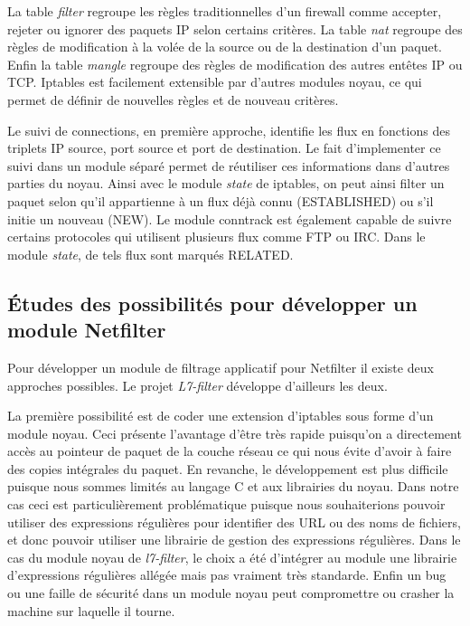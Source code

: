 La table \textit{filter} regroupe les règles traditionnelles d'un
firewall comme accepter, rejeter ou ignorer des paquets IP selon
certains critères. La table \textit{nat} regroupe des règles de
modification à la volée de la source ou de la destination d'un
paquet. Enfin la table \textit{mangle} regroupe des règles de
modification des autres entêtes IP ou TCP. Iptables est facilement
extensible par d'autres modules noyau, ce qui permet de définir de
nouvelles règles et de nouveau critères.

Le suivi de connections, en première approche, identifie les flux en
fonctions des triplets IP source, port source et port de
destination. Le fait d'implementer ce suivi dans un module séparé
permet de réutiliser ces informations dans d'autres parties du
noyau. Ainsi avec le module \textit{state} de iptables, on peut ainsi
filter un paquet selon qu'il appartienne à un flux déjà connu
(ESTABLISHED) ou s'il initie un nouveau (NEW). Le module conntrack est
également capable de suivre certains protocoles qui utilisent
plusieurs flux comme FTP ou IRC. Dans le module \textit{state}, de
tels flux sont marqués RELATED.

\subsection{Études des possibilités pour développer un module Netfilter}


Pour développer un module de filtrage applicatif pour Netfilter il
existe deux approches possibles. Le projet \textit{L7-filter}
\cite{l7} développe d'ailleurs les deux.

La première possibilité est de coder une extension d'iptables sous
forme d'un module noyau. Ceci présente l'avantage d'être très rapide
puisqu'on a directement accès au pointeur de paquet de la couche
réseau ce qui nous évite d'avoir à faire des copies intégrales du
paquet. En revanche, le développement est plus difficile puisque nous
sommes limités au langage C et aux librairies du noyau. Dans notre cas
ceci est particulièrement problématique puisque nous souhaiterions
pouvoir utiliser des expressions régulières pour identifier des URL ou
des noms de fichiers, et donc pouvoir utiliser une librairie de
gestion des expressions régulières. Dans le cas du module noyau de
\textit{l7-filter}, le choix a été d'intégrer au module une librairie
d'expressions régulières allégée mais pas vraiment très
standarde. Enfin un bug ou une faille de sécurité dans un module noyau
peut compromettre ou crasher la machine sur laquelle il tourne.

